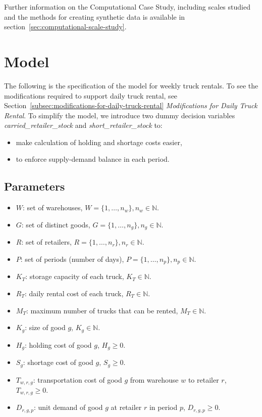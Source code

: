 \documentclass[a4paper,12pt]{article}
\begin{document}
Further information on the Computational Case Study, including scales studied and the methods for creating synthetic data is available in section~\ref{sec:computational-scale-study}.





\section{Model}\label{sec:model}

The following is the specification of the model for weekly truck rentals.
To see the modifications required to support daily truck rental, see Section~\ref{subsec:modifications-for-daily-truck-rental} \textit{Modifications for Daily Truck Rental}.
To simplify the model, we introduce two dummy decision variables \textit{carried\_retailer\_stock} and \textit{short\_retailer\_stock} to:
\begin{itemize}
    \item make calculation of holding and shortage costs easier,
    \item to enforce supply-demand balance in each period.
\end{itemize}

\subsection{Parameters}\label{subsec:parameters}
\begin{itemize}
    \item $W$: set of warehouses, $W = \{1, \hdots, n_w\}, n_w\in \mathbb{N}$.
    \item $G$: set of distinct goods, $G = \{1, \hdots, n_g\}, n_g \in \mathbb{N}$.
    \item $R$: set of retailers, $R = \{1, \hdots, n_r\}, n_r \in \mathbb{N}$.
    \item $P$: set of periods (number of days), $P = \{1, \hdots, n_p\}, n_p \in \mathbb{N}$.
    \item $K_T$: storage capacity of each truck, $K_T \in \mathbb{N}$.
    \item $R_T$: daily rental cost of each truck, $R_T \in \mathbb{N}$.
    \item $M_T$: maximum number of trucks that can be rented, $M_T \in \mathbb{N}$.
    \item $K_g$: size of good $g$, $K_g \in \mathbb{N}$.
    \item $H_g$: holding cost of good $g$, $H_g \geq 0$.
    \item $S_g$: shortage cost of good $g$, $S_g \geq 0$.
    \item $T_{w,r,g}$: transportation cost of good $g$ from warehouse $w$ to retailer $r$, $T_{w,r,g} \geq 0$.
    \item $D_{r,g,p}$: unit demand of good $g$ at retailer $r$ in period $p$, $D_{r,g,p} \geq 0$.
\end{itemize}
\end{document}
